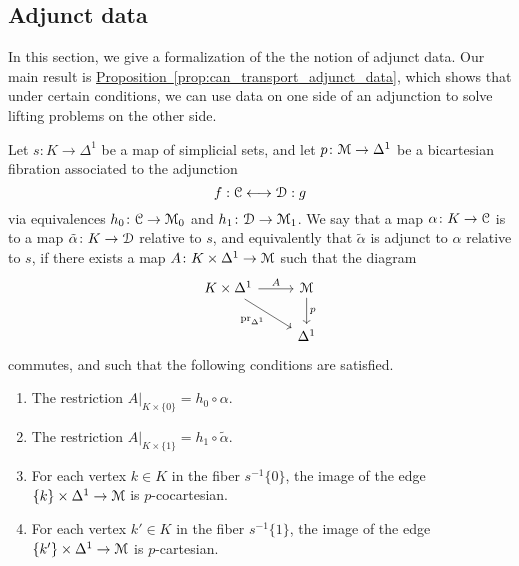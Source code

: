 \documentclass[main.tex]{subfiles}
\begin{document}
\subsection{Adjunct data}
\label{ssc:adjunct_data}

In this section, we give a formalization of the the notion of adjunct data. Our main result is \hyperref[prop:can_transport_adjunct_data]{Proposition~\ref*{prop:can_transport_adjunct_data}}, which shows that under certain conditions, we can use data on one side of an adjunction to solve lifting problems on the other side.

\begin{definition}
  \label{def:adjunct_data}
  Let $s\colon K \to \Delta^{1}$ be a map of simplicial sets, and let $p\colon \mathcal{M} \to \Delta^{1}$ be a bicartesian fibration associated to the adjunction
  \begin{equation*}
    f : \mathcal{C} \longleftrightarrow \mathcal{D} : g
  \end{equation*}
  via equivalences $h_{0}\colon \mathcal{C} \to \mathcal{M}_{0}$ and $h_{1}\colon \mathcal{D} \to \mathcal{M}_{1}$. We say that a map $\alpha\colon K \to \mathcal{C}$ is  to a map $\tilde{\alpha}\colon K \to \mathcal{D}$ relative to $s$, and equivalently that $\tilde{\alpha}$ is adjunct to $\alpha$ relative to $s$, if there exists a map $A\colon K \times \Delta^{1} \to \mathcal{M}$ such that the diagram
  \begin{equation*}
    \begin{tikzcd}
      K \times \Delta^{1}
      \arrow[r, "A"]
      \arrow[dr, swap, "\pr_{\Delta^{1}}"]
      & \category{M}
      \arrow[d, "p"]
      \\
      & \Delta^{1}
    \end{tikzcd}
  \end{equation*}
  commutes, and such that the following conditions are satisfied.
  \begin{enumerate}
    \item The restriction $A|_{K \times \{0\}} = h_{0} \circ \alpha$.

    \item The restriction $A|_{K \times \{1\}} = h_{1} \circ \tilde{\alpha}$.

    \item For each vertex $k \in K$ in the fiber $s^{-1}\{0\}$, the image of the edge $\{k\} \times \Delta^{1} \to \mathcal{M}$ is $p$-cocartesian.

    \item For each vertex $k' \in K$ in the fiber $s^{-1}\{1\}$, the image of the edge $\{k'\} \times \Delta^{1} \to \mathcal{M}$ is $p$-cartesian.
  \end{enumerate}
\end{definition}
\end{document}
